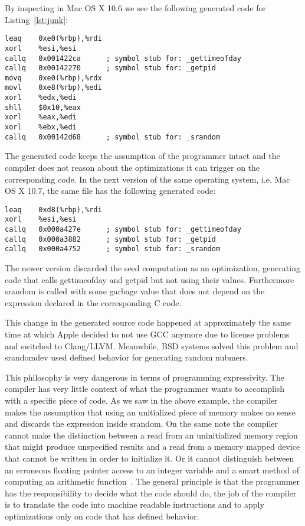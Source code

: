 By inspecting  in Mac OS X 10.6 we see
the following generated code for Listing~\ref{lst:junk}:
\begin{lstlisting}[style=Cstyle, caption={}, label={lst:junk}]
leaq    0xe0(%rbp),%rdi
xorl    %esi,%esi
callq   0x001422ca      ; symbol stub for: _gettimeofday
callq   0x00142270      ; symbol stub for: _getpid
movq    0xe0(%rbp),%rdx
movl    0xe8(%rbp),%edi
xorl    %edx,%edi
shll    $0x10,%eax
xorl    %eax,%edi
xorl    %ebx,%edi
callq   0x00142d68      ; symbol stub for: _srandom
\end{lstlisting}

The generated code keeps the assumption of the programmer intact and the
compiler does not reason about the optimizations it can trigger on the
corresponding code. In the next version of the same operating system,
i.e. Mac OS X 10.7, the same file has the following generated code:

\begin{lstlisting}[style=Cstyle, caption={}, label={lst:junk}]
leaq    0xd8(%rbp),%rdi
xorl    %esi,%esi
callq   0x000a427e      ; symbol stub for: _gettimeofday
callq   0x000a3882      ; symbol stub for: _getpid
callq   0x000a4752      ; symbol stub for: _srandom
\end{lstlisting}

The newer version discarded the seed computation as an optimization,
generating code that calls gettimeofday and getpid but not using their
values. Furthermore srandom is called with some garbage value that does
not depend on the expression declared in the corresponding C code.

This change in the generated source code happened at approximately the
same time at which Apple decided to not use GCC anymore due to license
problems and switched to Clang/LLVM. Meanwhile, BSD systems solved this
problem and srandomdev used defined behavior for generating random
nubmers.

This philosophy is very dangerous in terms of programming expressivity.
The compiler has very little context of what the programmer wants to
accomplish with a specific piece of code. As we saw in the above
example, the compiler makes the assumption that using an unitialized
piece of memory makes no sense and discards the expression inside
srandom. On the same note the compiler cannot make the distinction
between a read from an uninitialized memory region that might produce
unspecified results and a read from a memory mapped device that cannot
be written in order to initialize it. Or it cannot distinguish between
an erroneous floating pointer access to an integer variable and a smart
method of computing an arithmetic function~\cite{lomont2003fast}. The
general principle is that the programmer has the responsibility to
decide what the code should do, the job of the compiler is to translate
the code into machine readable instructions and to apply optimizations
only on code that has defined behavior.

